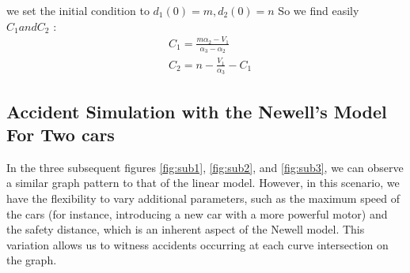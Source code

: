 \documentclass{article}
\begin{document}
	we set the initial condition to \newline 
	$d_1(0)=m, d_2(0)=n$ So we find easily $C_1 and C_2$ : 
	\begin{align*}
		&C_1=\frac{m\alpha_2-V_1}{\alpha_3-\alpha_2} \\
		&C_2=n-\frac{V_1}{\alpha_3} - C_1
	\end{align*}
	
	\subsection{Accident Simulation with the Newell's Model For Two cars}
	
	In the three subsequent figures \ref{fig:sub1}, \ref{fig:sub2}, and \ref{fig:sub3}, we can observe a similar graph pattern to that of the linear model. However, in this scenario, we have the flexibility to vary additional parameters, such as the maximum speed of the cars (for instance, introducing a new car with a more powerful motor) and the safety distance, which is an inherent aspect of the Newell model. This variation allows us to witness accidents occurring at each curve intersection on the graph.
	
\end{document}
